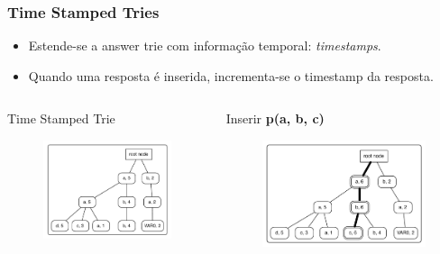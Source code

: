 \documentclass{beamer}
\begin{document}
\begin{frame}
  \frametitle{Time Stamped Tries}
  \begin{itemize}
     \item Estende-se a answer trie com informação temporal: \emph{timestamps}.
     \item<2-> Quando uma resposta é inserida, incrementa-se o timestamp da resposta.
  \end{itemize}
  \begin{columns}[t]
        \begin{block}{Time Stamped Trie}
          \begin{figure}[ht]
            \centering
              \includegraphics[scale=0.4]{tst_1.pdf}
          \end{figure}
        \end{block}
        \pause
        \begin{block}{Inserir \textbf{p(a, b, c)}}
          \begin{figure}[ht]
            \centering
              \includegraphics[scale=0.4]{tst_2.pdf}
          \end{figure}
        \end{block}
    \end{columns}
\end{frame}
\end{document}
